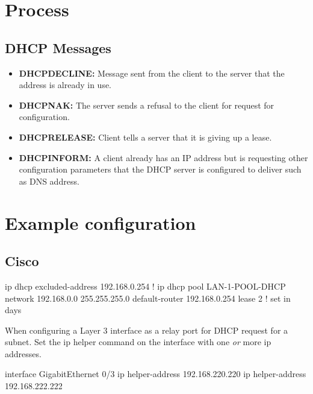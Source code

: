 \section{Process}


\subsection{DHCP Messages}

\begin{itemize}
    \item \textbf{DHCPDECLINE:} Message sent from the client to the server that the address is already in use.
    \item \textbf{DHCPNAK:} The server sends a refusal to the client for request for configuration.
    \item \textbf{DHCPRELEASE:} Client tells a server that it is giving up a lease.
    \item \textbf{DHCPINFORM:} A client already has an IP address but is requesting other configuration parameters that the DHCP server is configured to deliver such as DNS address.
\end{itemize}

\section{Example configuration}

\subsection{Cisco}

\begin{txt}
ip dhcp excluded-address 192.168.0.254
!
ip dhcp pool LAN-1-POOL-DHCP
 network 192.168.0.0 255.255.255.0
 default-router 192.168.0.254
 lease 2 ! set in days
\end{txt}

When configuring a Layer 3 interface as a relay port for DHCP request for a subnet. Set the ip helper command on the interface with one \textit{or} more ip addresses.

\begin{txt}
interface GigabitEthernet 0/3
 ip helper-address 192.168.220.220
 ip helper-address 192.168.222.222
\end{txt}
